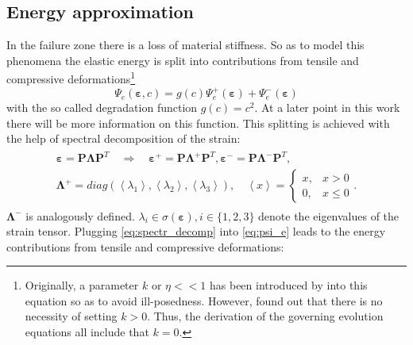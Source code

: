 \subsection{Energy approximation} \label{sec:energy_approx}
In the failure zone there is a loss of material stiffness. So as to model this phenomena the elastic energy is split into contributions from tensile and compressive deformations\footnote{Originally, a parameter $k$ or $\eta<<1$ has been introduced by \citet{09_PF_k} into this equation so as to avoid ill-posedness. However, \citet{01_PF_dyn_brittle} found out that there is no necessity of setting $k>0$. Thus, the derivation of the governing evolution equations all include that $k=0$.}
\begin{equation} \label{eq:el_energy}
	\Psi_{e}\left(\bm{\varepsilon},c\right)=g\left(c\right) \Psi_{e}^{+}\left(\bm{\varepsilon}\right)+\Psi_{e}^{-}\left(\bm{\varepsilon}\right)
\end{equation}
with the so called degradation function $g\left(c\right)=c^{2}$. At a later point in this work there will be more information on this function. This splitting is achieved with the help of spectral decomposition of the strain:
\begin{align} \label{eq:spectr_decomp}
	\begin{aligned}
		\bm{\varepsilon} = \mathbf{P}\bm{\Lambda}\mathbf{P}^{T} \quad \Rightarrow \quad \bm{\varepsilon}^{+} = \mathbf{P}\bm{\Lambda}^{+}\mathbf{P}^{T},  \bm{\varepsilon}^{-} = \mathbf{P}\bm{\Lambda}^{-}\mathbf{P}^{T}, \\
		\bm{\Lambda}^{+}=diag\left(\left<\lambda_{1}\right>,\left<\lambda_{2}\right>,\left<\lambda_{3}\right>\right), \quad \left<x\right>=\begin{cases}x, &x>0 \\ 0, & x\leq0\end{cases}.
	\end{aligned}
\end{align}
$\bm{\Lambda}^{-}$ is analogously                                                                                                                                                                                                                                                                                                                                                                                                                                                                                                          defined. $\lambda_{i}\in\sigma\left(\bm{\varepsilon}\right),i\in\{1,2,3\}$ denote the eigenvalues of the strain tensor. Plugging \eqref{eq:spectr_decomp} into \eqref{eq:psi_e} leads to the energy contributions from tensile and compressive deformations:
